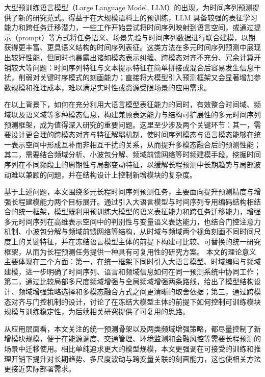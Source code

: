 大型预训练语言模型（Large Language Model, LLM）的出现，为时间序列预测提供了新的研究范式。得益于在大规模语料上的预训练，LLM 具备较强的表征学习能力和跨任务迁移潜力，一些工作开始尝试将时间序列映射到语言空间，或通过提示（prompt）等方式将任务语义、场景先验与时间序列数据进行联合建模，以期获得更丰富、更具语义结构的时间序列表征\cite{zhou2023onefitsall,jin2024timellm}。这类方法在多元时间序列预测中展现出较好性能，但同时也暴露出诸如模态表示纠缠、跨模态对齐不充分、冗余计算开销较大等问题：时间序列特征与文本提示特征在简单拼接或混合后容易发生信息干扰，削弱对关键时序模式的刻画能力；直接将大模型引入预测框架又会显著增加参数规模和推理成本，难以满足实时性或资源受限场景的应用需求\cite{jiang2024empowering}。

在以上背景下，如何在充分利用大语言模型表征能力的同时，有效整合时间域、频域以及语义域等多种模态信息，构建兼顾表达能力与结构可扩展性的多元时间序列预测框架，成为值得深入研究的重要问题。这里至少涉及两个关键环节：其一，需要设计更合理的跨模态对齐与特征解耦机制，使时间序列模态与语言模态能够在统一表示空间中形成互补而非相互干扰的关系，从而提升多模态融合后的预测性能\cite{ansari2024chronos}；其二，需要结合频域分析、小波包分解、频域前馈网络等时频建模手段，挖掘时间序列在不同频段上的周期性与局部变动特征，以缓解长程预测中长期趋势与局部波动难以兼顾的问题，并在结构设计上控制新增模块的复杂度\cite{zhou2022fedformer,girdhar2023imagebind}。

基于上述问题，本文围绕多元长程时间序列预测任务，主要面向提升预测精度与增强长程建模能力两个目标展开。通过引入大语言模型与时间序列专用编码结构相结合的统一框架，模型既利用预训练大模型的语义表征能力和跨任务迁移能力，增强多元时间序列在高维表示空间中的判别性与变量语义表达能力，也结合门控注意力机制\cite{qiu2025gatedattention}、小波包分解\cite{coifman1992bestbasis}与频域前馈网络\cite{yi2023frets}等结构，从时域与频域两个视角刻画不同时间尺度上的关键特征，并在冻结语言模型主体的前提下构建可比较、可替换的统一研究框架，从而为长程预测任务提供一种具有可复用性的研究方案。
本文的理论意义主要体现在三个方面：第一，在统一框架下同时引入大语言模型、时域编码与频域建模，进一步明确了时间序列、语言和频域信息如何在同一预测系统中协同工作；第二，通过比较局部多尺度频域增强与全局频域增强两条路线，给出了模型结构设计、频域增强策略选择和多模态融合方式之间更清晰的取舍依据；第三，通过跨模态对齐与门控机制的设计，讨论了在冻结大模型主体的前提下如何控制可训练模块规模与训练稳定性，为后续相关研究提供了可复用的思路。

从应用层面看，本文关注的统一预测骨架以及两类频域增强策略，都尽量控制了新增模块规模，便于在能源调度、交通管理、环境监测和金融风控等需要长程预测的场景中迁移使用。相比单纯追求更大的模型规模，本文更强调在可接受的训练和推理开销下提升对长期趋势、多尺度波动与跨变量关联的刻画能力，这也使相关方法更接近实际部署需求。

